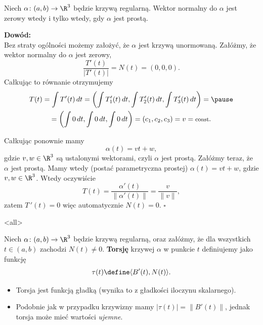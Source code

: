 \begin{frame}

\begin{lemat}
Niech $\alpha\colon (a,b)\to \R^3$ będzie krzywą regularną. Wektor normalny do $\alpha$ jest zerowy wtedy i tylko wtedy, gdy $\alpha$ jest prostą.
\end{lemat}
\pause\textcolor{ared}{\textbf{Dowód:}}\\
Bez straty ogólności możemy założyć, że $\alpha$ jest krzywą unormowaną.
\pause Załóżmy, że wektor normalny do $\alpha$ jest zerowy, \[\frac{T'(t)}{|T'(t)|}=N(t)=(0,0,0).\] \pause 
Całkując to równanie otrzymujemy 
 \begin{multline*}
T(t)=\int T'(t)\,dt=\left(\int T_1 '(t)\,dt,\int T_2 '(t)\,dt, \int T_3 '(t)\,dt\right)=\pause\\=\left(\int 0\,dt,\int 0\,dt, \int 0\,dt\right)=(c_1,c_2,c_3)=v=\text{\footnotesize{const}}.
\end{multline*}


\end{frame}
\begin{frame}[<+->]
Całkując ponownie mamy \[\alpha(t)=vt+w,\] gdzie $v,w\in \R^3$ są ustalonymi wektorami, czyli $\alpha$ jest prostą.
\pause 
Załóżmy teraz, że $\alpha$ jest prostą. \pause Mamy wtedy (postać parametryczna prostej) $\alpha(t)=vt+w$, gdzie $v,w\in \R^3$. \pause Wtedy oczywiście \[T(t)=\frac{\alpha'(t)}{\|\alpha'(t)\|}=\frac{v}{\|v\|},\] zatem $T\,'(t)=0$ więc automatycznie $N(t)=0$.
\hfill $\square$

\end{frame}
\mode<all>{}
\begin{frame}[<+->]
\begin{definicja}
Niech $\alpha\colon (a,b)\to \R^3$ będzie krzywą regularną, oraz załóżmy, że dla wszystkich $t\in (a,b)$ zachodzi $N(t)\neq 0$. \textbf{Torsję} krzywej $\alpha$ w punkcie $t$ definiujemy jako funkcję \[\tau(t)\define \langle B'(t),N(t)\rangle.\]
\end{definicja}

\begin{uwaga}
\begin{itemize}
\item Torsja jest funkcją gładką (wynika to z gładkości iloczynu skalarnego).
\item Podobnie jak w przypadku krzywizny mamy $|\tau(t)|=\|B'(t)\|$, jednak torsja może mieć wartości \textit{ujemne}.
\end{itemize}
\end{uwaga}

\end{frame}
